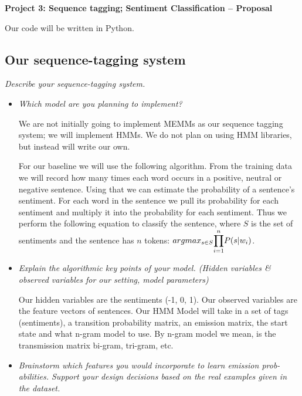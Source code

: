 \documentclass{article}
\begin{document}
\begin{center}\textbf{Project 3: Sequence tagging; Sentiment Classification -- Proposal}\end{center}

Our code will be written in Python.

\subsection*{Our sequence-tagging system}

\textit{Describe your sequence-tagging system.}\par

\begin{itemize}
\item \textit{Which model are you planning to implement?}\par

We are not initially going to implement MEMMs as our sequence tagging system; we will implement HMMs. We do not plan on using HMM libraries, but instead will write our own.

For our baseline we will use the following algorithm. From the training data we will record how many times each word occurs in a positive, neutral or negative sentence. Using that we can estimate the probability of a sentence's sentiment. For each word in the sentence we pull its probability for each sentiment and multiply it into the probability for each sentiment. Thus we perform the following equation to classify the sentence, where $S$ is the set of sentiments and the sentence has $n$ tokens: $argmax_{s \in S}\mathlarger{\prod_{i=1}^n} P(s|w_i)$.

\item \textit{Explain the algorithmic key points of your model. (Hidden variables \& observed variables for our setting, model parameters)}\par

Our hidden variables are the sentiments (-1, 0, 1). Our observed variables are the feature vectors of sentences. Our HMM Model will take in a set of tags (sentiments), a transition probability matrix, an emission matrix, the start state and what n-gram model to use. By n-gram model we mean, is the transmission matrix bi-gram, tri-gram, etc.

\item \textit{Brainstorm which features you would incorporate to learn emission prob-
abilities. Support your design decisions based on the real examples given
in the dataset.}\par


\end{itemize}
\end{document}

